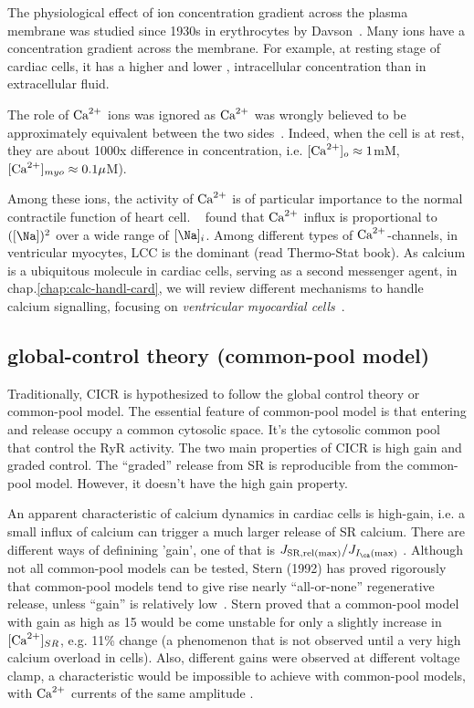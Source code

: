 The physiological effect of ion concentration gradient across the plasma
membrane was studied since 1930s in erythrocytes by
Davson~\citep{davson1938spe,davson1940pec}. Many ions have a concentration
gradient across the membrane. For example, at resting stage of cardiac cells, it
has a higher  and lower ,  intracellular concentration
than in extracellular fluid.

The role of ${\text{Ca}^{2+}}$ ions was ignored as ${\text{Ca}^{2+}}$ was wrongly believed to be
approximately equivalent between the two sides~\citep{overman1959pei}. Indeed,
when the cell is at rest, they are about 1000x difference in concentration, i.e.
$[\ce{Ca^2+}]_o\approx 1$mM, $[\ce{Ca^2+}]_{myo}\approx 0.1\mu$M).

Among these ions, the activity of ${\text{Ca}^{2+}}$ is of particular importance to the
normal contractile function of heart cell. ~\citep{glitsch1970} found that ${\text{Ca}^{2+}}$
influx is proportional to $([\Na])^2$ over a wide range of $[\Na]_i$. Among
different types of ${\text{Ca}^{2+}}$-channels, in ventricular myocytes, LCC is the dominant
(read Thermo-Stat book).  As calcium is a ubiquitous molecule in cardiac cells,
serving as a second messenger agent, in chap.\ref{chap:calc-handl-card}, we will
review different mechanisms to handle calcium signalling, focusing on {\it
ventricular myocardial cells}~\citep{rice2001mch}.






\subsection{global-control theory (common-pool model)}
\label{sec:glob-contr-theory}

Traditionally, CICR is hypothesized to follow the global control
theory or common-pool model. The essential feature of common-pool
model is that entering  and release  occupy a
common cytosolic space. It's the cytosolic  common pool that
control the RyR activity. The two main properties of CICR is high gain
and graded control. The ``graded''  release from SR is
reproducible from the common-pool model. However, it doesn't have the
high gain property.

An apparent characteristic of calcium dynamics in cardiac cells is high-gain,
i.e. a small influx of calcium can trigger a much larger release of SR calcium.
There are different ways of definining 'gain', one of that is
$J_\text{SR,rel(max)}/J_{I_\ca(\max)}$ \citep{wier1994lce}. Although not all
common-pool models can be tested, Stern (1992) has proved rigorously that
common-pool models tend to give rise nearly ``all-or-none'' regenerative
 release, unless ``gain'' is relatively low~\citep{stern1992tec}.
Stern proved that a common-pool model with gain as high as 15 would be come
unstable for only a slightly increase in $[\ce{Ca^2+}]_{SR}$, e.g. 11\% change
(a phenomenon that is not observed until a very high calcium overload in cells).
Also, different gains were observed at different voltage clamp, a characteristic
would be impossible to achieve with common-pool models, with ${\text{Ca}^{2+}}$ currents of
the same amplitude \citep{wier1994lce}.

